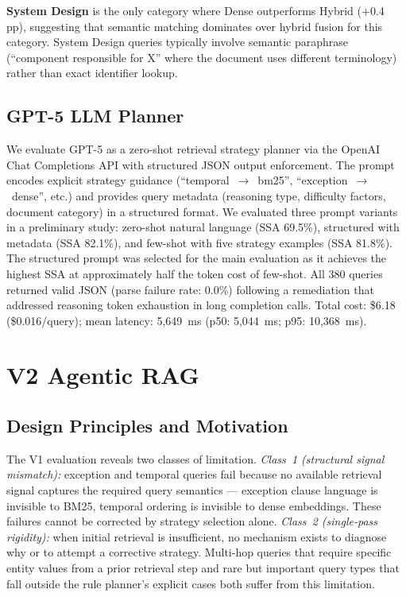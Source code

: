 \documentclass[11pt, a4paper]{article}
\begin{document}
\textbf{System Design} is the only category where Dense outperforms Hybrid (+0.4 pp), suggesting that semantic matching dominates over hybrid fusion for this category. System Design queries typically involve semantic paraphrase (``component responsible for X'' where the document uses different terminology) rather than exact identifier lookup.

\subsection{GPT-5 LLM Planner}

We evaluate GPT-5 as a zero-shot retrieval strategy planner via the OpenAI Chat Completions API with structured JSON output enforcement. The prompt encodes explicit strategy guidance (``temporal~$\to$~bm25'', ``exception~$\to$~dense'', etc.) and provides query metadata (reasoning type, difficulty factors, document category) in a structured format. We evaluated three prompt variants in a preliminary study: zero-shot natural language (SSA 69.5\%), structured with metadata (SSA 82.1\%), and few-shot with five strategy examples (SSA 81.8\%). The structured prompt was selected for the main evaluation as it achieves the highest SSA at approximately half the token cost of few-shot. All 380 queries returned valid JSON (parse failure rate: 0.0\%) following a remediation that addressed reasoning token exhaustion in long completion calls. Total cost: \$6.18 (\$0.016/query); mean latency: 5,649~ms (p50: 5,044~ms; p95: 10,368~ms).

\section{V2 Agentic RAG}
\label{sec:v2}

\subsection{Design Principles and Motivation}

The V1 evaluation reveals two classes of limitation. \emph{Class~1 (structural signal mismatch):} exception and temporal queries fail because no available retrieval signal captures the required query semantics --- exception clause language is invisible to BM25, temporal ordering is invisible to dense embeddings. These failures cannot be corrected by strategy selection alone. \emph{Class~2 (single-pass rigidity):} when initial retrieval is insufficient, no mechanism exists to diagnose why or to attempt a corrective strategy. Multi-hop queries that require specific entity values from a prior retrieval step and rare but important query types that fall outside the rule planner's explicit cases both suffer from this limitation.
\end{document}
